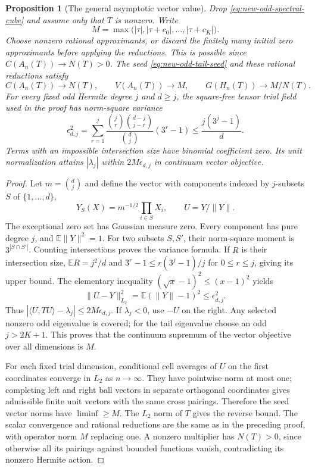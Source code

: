 \documentclass[11pt]{article}
\newtheorem{proposition}[theorem]{Proposition}
\begin{document}
\begin{proposition}[The general asymptotic vector value]
\label{prop:new-general-vector-value}
Drop \eqref{eq:new-odd-spectral-cube} and assume only that $T$ is
nonzero.  Write
\[
 M=\max\bigl(|\tau|,|\tau+c_0|,\ldots,|\tau+c_K|\bigr).
\]
Choose nonzero rational approximants, or discard the finitely many initial
zero approximants before applying the reductions. This is possible since
$C(A_n(T))\to N(T)>0$. The seed \eqref{eq:new-odd-tail-seed}
and these rational reductions satisfy
\[
 C(A_n(T))\to N(T),\qquad V(A_n(T))\to M,
                    \qquad G(H_n(T))\to M/N(T).
\]
For every fixed odd Hermite degree $j$ and $d\geq j$, the square-free
tensor trial field used in the proof has norm-square variance
\[
 \epsilon_{d,j}^2=
 \sum_{r=1}^j
 \frac{\binom jr\binom{d-j}{j-r}}{\binom dj}(3^r-1)
                  \leq\frac{j(3^j-1)}d.
\]
Terms with an impossible intersection size have binomial coefficient
zero.  Its unit normalization attains $|\lambda_j|$
within $2M\epsilon_{d,j}$ in continuum vector objective.
\end{proposition}
\begin{proof}
Let $m=\binom dj$ and define the vector with components indexed by
$j$-subsets $S$ of $\{1,\ldots,d\}$,
\[
 Y_S(X)=m^{-1/2}\prod_{i\in S}X_i,\qquad U=Y/\|Y\|.
\]
The exceptional zero set has Gaussian measure zero.  Every component
has pure degree $j$, and $\mathbb E\|Y\|^2=1$.  For two subsets
$S,S'$, their norm-square moment is $3^{|S\cap S'|}$.
Counting intersections proves the variance formula.  If $R$ is their
intersection size, $\mathbb ER=j^2/d$ and
$3^r-1\leq r(3^j-1)/j$ for $0\leq r\leq j$, giving its upper bound.
The elementary inequality $(\sqrt{x}-1)^2\leq(x-1)^2$ yields
\[
 \|U-Y\|_{L_2}^2=\mathbb E(\|Y\|-1)^2
                   \leq\epsilon_{d,j}^2.
\]
Thus
$|\langle U,TU\rangle-\lambda_j|\leq2M\epsilon_{d,j}$.
If $\lambda_j<0$, use $-U$ on the right.  Any selected nonzero odd
eigenvalue is covered; for the tail eigenvalue choose an odd
$j>2K+1$.  This proves that the continuum supremum of the vector
objective over all dimensions is $M$.

For each fixed trial dimension, conditional cell averages of $U$
on the first coordinates converge in $L_2$ as $n\to\infty$.
They have pointwise norm at most one; completing left and right
ball vectors in separate orthogonal coordinates gives admissible
finite unit vectors with the same cross pairings.  Therefore the
seed vector norms have $\liminf\geq M$.  The $L_2$ norm of $T$ gives
the reverse bound.  The scalar convergence and rational reductions
are the same as in the preceding proof, with operator norm $M$
replacing one.  A nonzero multiplier has $N(T)>0$, since otherwise
all its pairings against bounded functions vanish, contradicting its
nonzero Hermite action.
\end{proof}
\end{document}
